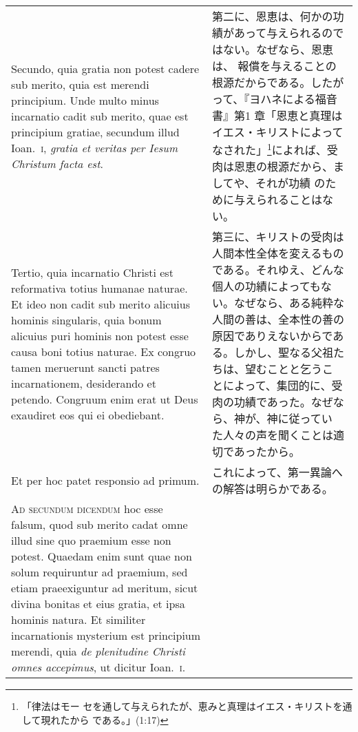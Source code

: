 \documentclass[10pt]{jsarticle} %
\begin{document}
\begin{longtable}{p{21em}p{21em}}
\\

 Secundo, quia gratia non potest cadere sub merito, quia est
merendi principium. Unde multo minus incarnatio cadit sub merito, quae
est principium gratiae, secundum illud Ioan.~{\scshape i}, {\itshape gratia et veritas per
Iesum Christum facta est}. 


&


第二に、恩恵は、何かの功績があって与えられるのではない。なぜなら、恩恵は、
 報償を与えることの根源だからである。したがって、『ヨハネによる福音書』第1
 章「恩恵と真理はイエス・キリストによってなされた」\footnote{「律法はモー
 セを通して与えられたが、恵みと真理はイエス・キリストを通して現れたから
 である。」(1:17)}によれば、受肉は恩恵の根源だから、ましてや、それが功績
 のために与えられることはない。

\\



Tertio, quia incarnatio Christi est
reformativa totius humanae naturae. Et ideo non cadit sub merito
alicuius hominis singularis, quia bonum alicuius puri hominis non potest
esse causa boni totius naturae. Ex congruo tamen meruerunt sancti patres
incarnationem, desiderando et petendo. Congruum enim erat ut Deus
exaudiret eos qui ei obediebant.


&


第三に、キリストの受肉は人間本性全体を変えるものである。それゆえ、どんな
 個人の功績によってもない。なぜなら、ある純粋な人間の善は、全本性の善の
 原因でありえないからである。しかし、聖なる父祖たちは、望むことと乞うこ
 とによって、集団的に、受肉の功績であった。なぜなら、神が、神に従ってい
 た人々の声を聞くことは適切であったから。

\\



Et per hoc patet responsio ad primum.

&


これによって、第一異論への解答は明らかである。

\\


{\scshape Ad secundum dicendum} hoc esse falsum, quod sub merito cadat omne illud
sine quo praemium esse non potest. Quaedam enim sunt quae non solum
requiruntur ad praemium, sed etiam praeexiguntur ad meritum, sicut
divina bonitas et eius gratia, et ipsa hominis natura. Et similiter
incarnationis mysterium est principium merendi, quia {\itshape de plenitudine
Christi omnes accepimus}, ut dicitur Ioan.~{\scshape i}.



\end{longtable}
\end{document}
